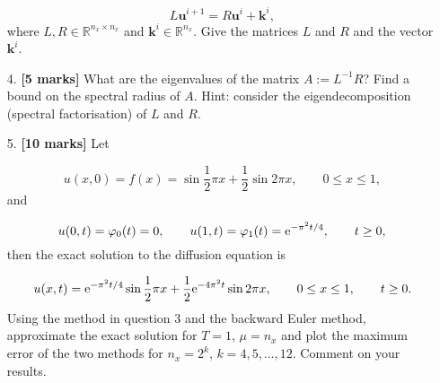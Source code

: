 \documentclass[12pt,a4paper]{article}
\begin{document}
\begin{itemize}
\[
L\mathbf{u}^{i+1} = R\mathbf{u}^{i} + \mathbf{k}^{i},
\]
where $L, R \in \mathbb{R}^{n_x \times n_x}$ and $\mathbf{k}^{i} \in \mathbb{R}^{n_x}$.  Give the matrices $L$ and $R$ and the vector $\mathbf{k}^{i}$.


\item[4. ] \textbf{[5 marks]} What are the eigenvalues of the matrix $A := L^{-1}R$? Find a bound on the spectral radius of $A$.   Hint: consider the eigendecomposition (spectral factorisation) of $L$ and $R$.


\item[5. ] \textbf{[10 marks]} Let 


\[
u(x,0) = f(x) = \sin \frac{1}{2}\pi x + \frac{1}{2}\sin 2\pi x, \qquad 0 \leq x \leq 1, 
\]
and

\[
u(0,t) = \varphi_0(t) = 0, \qquad  u(1,t) = \varphi_1(t) = {\rm e}^{-\pi^2 t/4}, \qquad t \geq 0,
\]
then the exact solution to the diffusion equation is

\[
u(x,t) = {\rm e}^{-\pi^2 t/4}\sin \frac{1}{2}\pi x + \frac{1}{2}{\rm e}^{-4\pi^2 t}\sin 2\pi x, \qquad 0 \leq x \leq 1, \qquad t \geq 0.
\]
Using the method in question 3 and the backward Euler method, approximate the exact solution for $T = 1$, $\mu = n_x$ and plot the maximum error of the two methods for $n_x = 2^k$, $k = 4, 5, \ldots, 12$.  Comment on your results.
\end{itemize}
\end{document}

